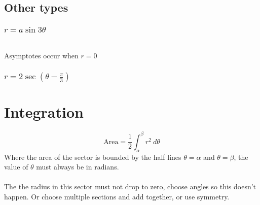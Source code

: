 \documentclass{article}
\begin{document}
\subsection{Other types}
\subsubsection{$r=a\sin3\theta$}
\\
Asymptotes occur when $r=0$
\subsubsection{$r=2\sec(\theta-\frac{\pi}{3})$}
\newpage
\section{Integration}
$$\textrm{Area}=\frac{1}{2}\int^\beta_\alpha r^2 \ d\theta$$
Where the area of the sector is bounded by the half lines $\theta=\alpha$ and $\theta=\beta$, the value of $\theta$ must always be in radians.\\
\\
The the radius in this sector must not drop to zero, choose angles so this doesn't happen. Or choose multiple sections and add together, or use symmetry. 
\end{document}
